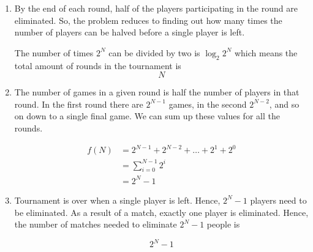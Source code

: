 \begin{enumerate}[label=(\alph*)]
\item By the end of each round, half of the players participating in the round
are eliminated. So, the problem reduces to finding out how many times the number
of players can be halved before a single player is left.

  The number of times $2^N$ can be divided by two is $\log_{2}{2^N}$ which means the total amount of rounds in the tournament is $$ N $$

\item The number of games in a given round is half the number of players in that
round. In the first round there are $2^{N-1}$ games, in the second $2^{N-2}$, and
so on down to a single final game. We can sum up these values for all the rounds.

  \begin{equation}
  \begin{split}
   f(N) & = 2^{N-1} + 2^{N-2} + \dots + 2^1 + 2^0\\
   & = \sum_{i=0}^{N-1} 2^{i}\\
   & = 2^N - 1
  \end{split}
  \end{equation}

\item Tournament is over when a single player is left. Hence, $2^N - 1$ players
need to be eliminated. As a result of a match, exactly one player is eliminated.
Hence, the number of matches needed to eliminate $2^N - 1$ people is

  $$ 2^N - 1$$
\end{enumerate}
